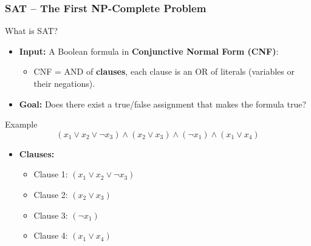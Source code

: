 \begin{frame}
    \frametitle{SAT – The First NP-Complete Problem}

    \begin{block}{What is SAT?}
        \begin{itemize}
            \item \textbf{Input:} A Boolean formula in \textbf{Conjunctive Normal Form (CNF)}:
            \begin{itemize}
                \item CNF = AND of \textbf{clauses}, each clause is an OR of literals (variables or their negations).
            \end{itemize}
            \item \textbf{Goal:} Does there exist a true/false assignment that makes the formula true?
        \end{itemize}
    \end{block}

    \vspace{0.5em}

    \begin{block}{Example}
        \[
        (x_1 \lor x_2 \lor \lnot x_3) \land (x_2 \lor x_3) \land (\lnot x_1) \land (x_1 \lor x_4)
        \]

        \begin{itemize}
            \item \textbf{Clauses:}
            \begin{itemize}
                \item Clause 1: $(x_1 \lor x_2 \lor \lnot x_3)$
                \item Clause 2: $(x_2 \lor x_3)$
                \item Clause 3: $(\lnot x_1)$
                \item Clause 4: $(x_1 \lor x_4)$
            \end{itemize}
        \end{itemize}
    \end{block}
\end{frame}



